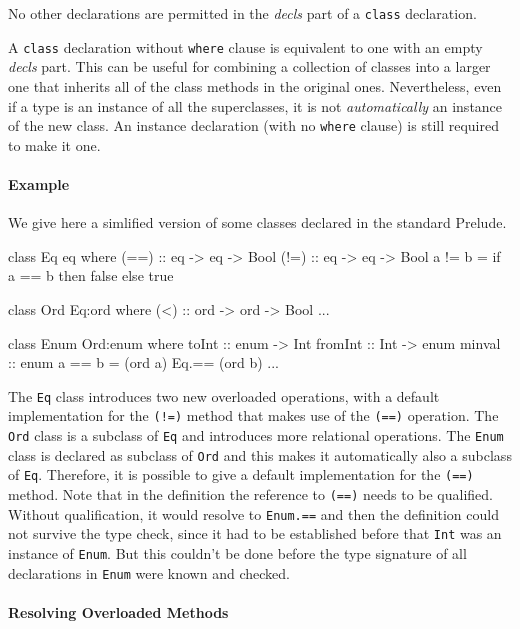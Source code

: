 No other declarations are permitted in the \emph{decls} part of a \texttt{class} declaration.

A \texttt{class} declaration without \texttt{where} clause is equivalent to one with an empty \emph{decls} part.
This can be useful for combining a collection of classes into a larger one that inherits all of the class methods in the original ones.
Nevertheless, even if a type is an instance of all the superclasses, it is not \emph{automatically} an instance of the new class. An instance declaration (with no \texttt{where} clause) is still required to make it one.

\paragraph*{Example} We give here a simlified version of some classes declared in the standard Prelude.

\label{classexample}
\begin{code}
class Eq eq where
    (==) :: eq -> eq -> Bool
    (!=) :: eq -> eq -> Bool
    a != b  =  if a == b then false else true

class Ord Eq:ord where
    (<)  :: ord -> ord -> Bool
    ...

class Enum Ord:enum where
    toInt   :: enum -> Int
    fromInt :: Int -> enum
    minval  :: enum
    a == b  =  (ord a) Eq.== (ord b)
    ...
\end{code}

The \texttt{Eq} class introduces two new overloaded operations, with a default implementation for the \texttt{(!=)} method that makes use of the \texttt{(==)} operation. The \texttt{Ord} class is a subclass of \texttt{Eq} and introduces more relational operations. The \texttt{Enum} class is declared as subclass of \texttt{Ord} and this makes it automatically also a subclass of \texttt{Eq}. Therefore, it is possible to give a default implementation for the \texttt{(==)} method. Note that in the definition the reference to \texttt{(==)} needs to be qualified. Without qualification, it would resolve to \texttt{Enum.==} and then the definition could not survive the type check, since it had to be established before that \texttt{Int} was an instance of \texttt{Enum}. But this couldn't be done before the type signature of all declarations in \texttt{Enum} were known and checked.

\paragraph*{Resolving Overloaded Methods}

